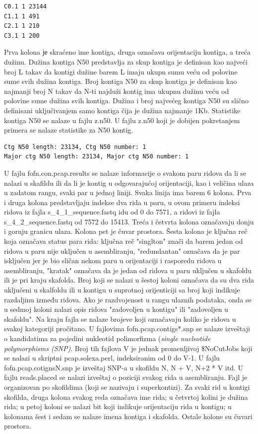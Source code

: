 \documentclass[a4paper]{article}
\begin{document}
{\begin{verbatim}
C0.1 1 23144 
C1.1 1 491 
C2.1 1 210 
C3.1 1 200 
\end{verbatim}
Prva kolona је skraćeno ime kontiga, druga označava orijentaciju kontiga, a treća dužinu. Dužina kontiga N50 predstavlja za skup kontiga je definisan kao najveći broj L takav da kontigi dužine barem L imaju ukupn sumu veću od polovine sume svih dužina kontiga. Broj kontiga N50 za skup kontiga je definisan kao najmanji broj N takav da N-ti najduži kontig ima ukupnu dužinu veću od polovine sume dužina svih kontiga. Dužina i broj najvećeg kontiga N50 su slično definisani uključivanjem samo kontiga čija je dužina najmanje 1Kb. Statistike kontiga N50 se nalaze u fajlu z.n50. U fajlu z.n50 koji je dobijen pokretanjem primera se nalaze statistike za N50 kontig.
\begin{verbatim}
Ctg N50 length: 23134, Ctg N50 number: 1
Major ctg N50 length: 23134, Major ctg N50 number: 1
\end{verbatim}

U fajlu fofn.con.pcap.results se nalaze informacije o svakom paru ridova da li se nalazi u skafildu ili da li je kontig u odgovarajućoj orijentaciji, kao i veličina ulaza u zadatom rangu, svaki par u jednoj liniji. Svaka linija ima barem 6 kolona. Prva i druga kolona predstavljaju indekse dva rida u paru, u ovom primeru indeksi ridova iz fajla s\_4\_1\_sequence.fastq idu od 0 do 7571, a ridovi iz fajla s\_4\_2\_sequence.fastq  od 7572 do 15413. Treća i četvrta kolona označavaju donju i gornju granicu ulaza. Kolona pet je čuvar prostora. Šesta kolona je ključna reč koja označava status para rida: ključna reč "singlton" znači da barem jedan od ridova u paru nije uključen u asembliranju, "redundantan" označava da je par isključen jer je bio sličan nekom paru u orijentaciji i rasporedu ridova u asembliranju, "kratak" označava da je jedan od ridova u paru uključen u skafoldu ili je pri kraju skafolda. Broj koji se nalazi u šestoj koloni označava da su dva rida uključeni u skalfoldu ili u kontigu u suprotnoj orijenticiji sa broj koji indikuje razdaljinu između ridova. Ako je razdvojenost u rangu ulaznih podataka, onda se u sedmoj koloni nalazi opis ridova "zadovoljen u kontigu" ili "zadovoljen u skafoldu". Na kraju fajla se nalaze brojeve koji označavaju koliko je ridova u svakoj kategoriji pročitano. U fajlovima fofn.pcap.contigs*.snp se nalaze izveštaji o kandidatima za pojedini nukleotid polimorfizma (\textit{single nucleotide polymorphisms (SNP)}. Broj tih fajlova V je jednak promenljivoj \$NoCutJobs koji se nalazi u skriptni pcap.solexa.perl, indeksiranim od 0 do V-1. U fajlu fofn.pcap.cotignsN.snp je izveštaj SNP-a u skofildu N, N + V, N+2 * V itd. 
\indent  U fajlu reads.placed se nalazi izveštaj o poziciji svakog rida u asembliranju. Fajl je organizovan po skofildima (koji se nazivaju i superkontizi). Za svaki rid u kontigi skofilda, druga kolona svakog reda označava ime rida; u četvrtoj kolini je dužina rida; u petoj koloni se nalazi bit koji indikuje orijentaciju rida u kontigu; u kolonama šest i sedam se nalaze imena kontiga i skafolda. Ostale kolone su čuvari prostora. 

}
\end{document}
